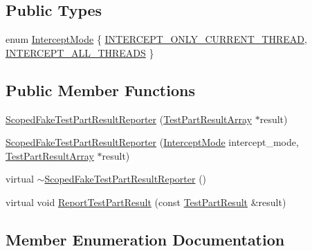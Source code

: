 \subsection*{Public Types}
\begin{DoxyCompactItemize}
\item 
enum \hyperlink{classtesting_1_1_scoped_fake_test_part_result_reporter_a82f6209b3cf5c4b15ec8bd8041dbc2d5}{Intercept\+Mode} \{ \hyperlink{classtesting_1_1_scoped_fake_test_part_result_reporter_a82f6209b3cf5c4b15ec8bd8041dbc2d5aed6c5f87d33207768db503526e6a1e8a}{I\+N\+T\+E\+R\+C\+E\+P\+T\+\_\+\+O\+N\+L\+Y\+\_\+\+C\+U\+R\+R\+E\+N\+T\+\_\+\+T\+H\+R\+E\+AD}, 
\hyperlink{classtesting_1_1_scoped_fake_test_part_result_reporter_a82f6209b3cf5c4b15ec8bd8041dbc2d5a187f4164aad7fbb9414b263c68a693cd}{I\+N\+T\+E\+R\+C\+E\+P\+T\+\_\+\+A\+L\+L\+\_\+\+T\+H\+R\+E\+A\+DS}
 \}
\end{DoxyCompactItemize}
\subsection*{Public Member Functions}
\begin{DoxyCompactItemize}
\item 
\hyperlink{classtesting_1_1_scoped_fake_test_part_result_reporter_aa0100ecf4799fb51d45167be6a5de1d5}{Scoped\+Fake\+Test\+Part\+Result\+Reporter} (\hyperlink{classtesting_1_1_test_part_result_array}{Test\+Part\+Result\+Array} $\ast$result)
\item 
\hyperlink{classtesting_1_1_scoped_fake_test_part_result_reporter_a57cbc09ed48627c8a73e622618dc4b4f}{Scoped\+Fake\+Test\+Part\+Result\+Reporter} (\hyperlink{classtesting_1_1_scoped_fake_test_part_result_reporter_a82f6209b3cf5c4b15ec8bd8041dbc2d5}{Intercept\+Mode} intercept\+\_\+mode, \hyperlink{classtesting_1_1_test_part_result_array}{Test\+Part\+Result\+Array} $\ast$result)
\item 
virtual \hyperlink{classtesting_1_1_scoped_fake_test_part_result_reporter_a4817d59ca70228ebd5d5c3c4e8dd729d}{$\sim$\+Scoped\+Fake\+Test\+Part\+Result\+Reporter} ()
\item 
virtual void \hyperlink{classtesting_1_1_scoped_fake_test_part_result_reporter_a82531434f51632d98ed7cdcdb10b8b92}{Report\+Test\+Part\+Result} (const \hyperlink{classtesting_1_1_test_part_result}{Test\+Part\+Result} \&result)
\end{DoxyCompactItemize}


\subsection{Member Enumeration Documentation}
\mbox{\label{classtesting_1_1_scoped_fake_test_part_result_reporter_a82f6209b3cf5c4b15ec8bd8041dbc2d5}} 
